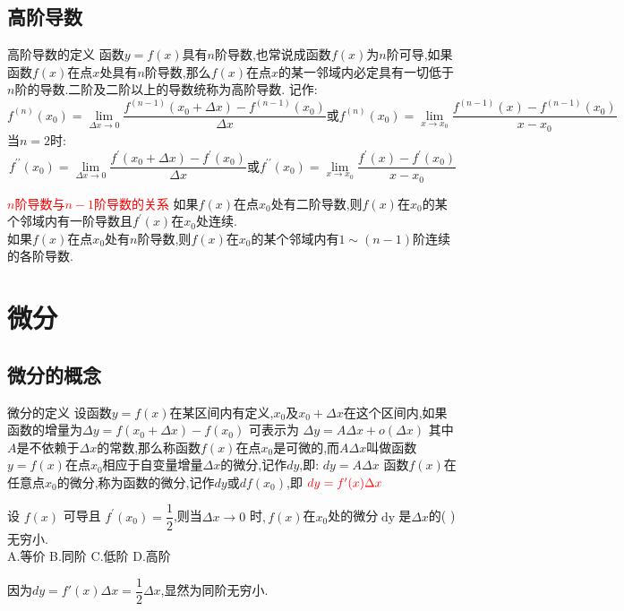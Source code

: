 \documentclass[8pt a4paper, oneside, UTF8]{ctexbook}  %
\begin{document}
\begin{sloppypar}
    \subsection{高阶导数}
    \begin{defn}{高阶导数的定义}{}
        函数$y=f(x)$具有$n$阶导数,也常说成函数$f(x)$为$n$阶可导,如果函数$f(x)$在点$x$处具有$n$阶导数,那么$f(x)$在点$x$的某一邻域内必定具有一切低于$n$阶的导数.二阶及二阶以上的导数统称为高阶导数.
        记作:
        $$
            f^{(n)}(x_0)=\lim_{\Delta x\to0}\dfrac{f^{(n-1)}(x_0+\Delta x)-f^{(n-1)}(x_0)}{\Delta x}\text{或}f^{(n)}(x_0)=\lim_{x\to x_0}\dfrac{f^{(n-1)}(x)-f^{(n-1)}(x_0)}{x-x_0}
        $$
        当$n=2$时:
        $$
            f^{\prime\prime}(x_0)=\lim_{\Delta x\to0}\dfrac{f^{\prime}(x_0+\Delta x)-f^{\prime}(x_0)}{\Delta x}\text{或}f^{\prime\prime}(x_0)=\lim_{x\to x_0}\dfrac{f^{\prime}(x)-f^{\prime}(x_0)}{x-x_0}
        $$
    \end{defn}
    \begin{corollary}{\textcolor{red}{$n$阶导数与$n-1$阶导数的关系}}{}
        如果$f(x)$在点$x_0$处有二阶导数,则$f(x)$在$x_0$的某个邻域内有一阶导数且$f^\prime(x)$在$x_0$处连续.\\
        如果$f(x)$在点$x_{0}$处有$n$阶导数,则$f(x)在x_0$的某个邻域内有$1 \sim (n-1)$阶连续的各阶导数.
    \end{corollary}
    \section{微分}
    \subsection{微分的概念}
    \begin{defn}{微分的定义}{}
        设函数$y=f(x)$在某区间内有定义,$x_0$及$x_0+\Delta x$在这个区间内,如果函数的增量为$\Delta y=f(x_{0}+\Delta x)-f(x_{0})$
        可表示为
        $   \Delta y=A\Delta x+o(\Delta x)$
        其中$A$是不依赖于$\Delta x$的常数,那么称函数$f(x)$在点$x_0$是可微的,而$A\Delta x$叫做函数$y=f(x)$在点$x_0$相应于自变量增量$\Delta x$​的微分,记作$dy$,即:
        $dy=A\Delta x$
        函数$f(x)$在任意点$x_0$的微分,称为函数的微分,记作$dy$或$df(x_0)$,即
        $\textcolor{red}{dy=f^{\prime}(x)\Delta x}$
    \end{defn}
    \begin{problem}
    设 $f(x)$ 可导且 $f^\prime(x_0)=\dfrac12$,则当$\Delta x\to0$ 时$,f(x)$在$x_0$处的微分$\operatorname{dy}$是$\Delta x$的( )无穷小.\\
    A.等价 \quad B.同阶 \quad C.低阶 \quad D.高阶
    \end{problem}
    \begin{solution}
        因为$dy=f'(x) \Delta x=\dfrac{1}{2}\Delta x$,显然为同阶无穷小.
    \end{solution}

\end{sloppypar}
\end{document}

